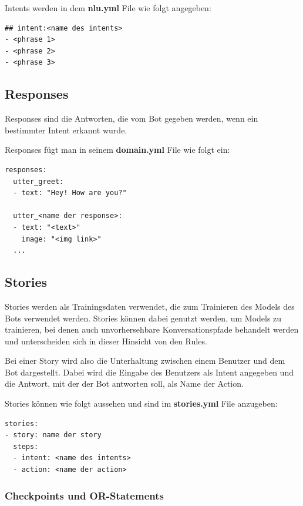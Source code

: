 Intents werden in dem \textbf{nlu.yml} File wie folgt angegeben:

\begin{lstlisting}[label={lst: Intent Example}]
## intent:<name des intents>
- <phrase 1>
- <phrase 2>
- <phrase 3>
\end{lstlisting}

\subsection{Responses}

Responses sind die Antworten, die vom Bot gegeben werden, wenn ein bestimmter Intent erkannt wurde.\cite{responses}

Responses fügt man in seinem \textbf{domain.yml} File wie folgt ein:

\begin{lstlisting}[label={lst: Responses Example}]
responses:
  utter_greet:
  - text: "Hey! How are you?"

  utter_<name der response>:
  - text: "<text>"
    image: "<img link>"
  ...
\end{lstlisting}


\subsection{Stories}

Stories werden als Trainingsdaten verwendet, die zum Trainieren des Models des Bots verwendet werden.
Stories können dabei genutzt werden, um Models zu trainieren, bei denen auch unvorhersehbare Konversationspfade behandelt werden und unterscheiden sich in dieser Hinsicht von den Rules.
\cite{stories}

Bei einer Story wird also die Unterhaltung zwischen einem Benutzer und dem Bot dargestellt.
Dabei wird die Eingabe des Benutzers als Intent angegeben und die Antwort, mit der der Bot antworten soll, als Name der Action.
\cite{stories}

Stories können wie folgt aussehen und sind im \textbf{stories.yml} File anzugeben:

\begin{lstlisting}[label={lst: Stories Example}]
stories:
- story: name der story
  steps:
  - intent: <name des intents>
  - action: <name der action>
\end{lstlisting}

\subsubsection{Checkpoints und OR-Statements}


